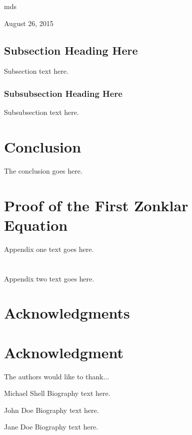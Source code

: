 \documentclass[10pt,journal,compsoc]{IEEEtran}
\begin{document}
\hfill mds
 
\hfill August 26, 2015

\subsection{Subsection Heading Here}
Subsection text here.


\subsubsection{Subsubsection Heading Here}
Subsubsection text here.













\section{Conclusion}
The conclusion goes here.








\appendices
\section{Proof of the First Zonklar Equation}
Appendix one text goes here.

\section{}
Appendix two text goes here.


\ifCLASSOPTIONcompsoc
  \section*{Acknowledgments}
\else
  \section*{Acknowledgment}
\fi


The authors would like to thank...


\ifCLASSOPTIONcaptionsoff
  \newpage
\fi







\begin{IEEEbiography}{Michael Shell}
Biography text here.
\end{IEEEbiography}

\begin{IEEEbiographynophoto}{John Doe}
Biography text here.
\end{IEEEbiographynophoto}


\begin{IEEEbiographynophoto}{Jane Doe}
Biography text here.
\end{IEEEbiographynophoto}
\end{document}
